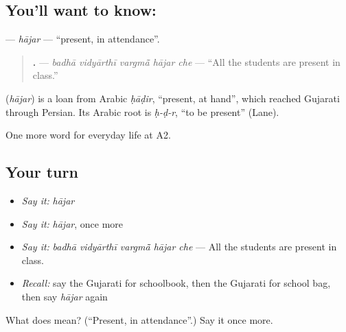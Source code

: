 \subsection*{You'll want to know: }
\textbf{} — \emph{hājar} — \textquotedblleft{}present, in attendance\textquotedblright{}.

\begin{quote}
\textbf{    .} — \emph{badhā vidyārthī vargmā̃ hājar che} — \textquotedblleft{}All the students are present in class.\textquotedblright{}
\end{quote}

\begin{cousinweb}
\textbf{} (\emph{hājar}) is a loan from Arabic \emph{ḥāḍir}, \textquotedblleft{}present, at hand\textquotedblright{}, which reached Gujarati through Persian. Its Arabic root is \emph{ḥ-ḍ-r}, \textquotedblleft{}to be present\textquotedblright{} (Lane).
\end{cousinweb}

\begin{grammarlens}[title={What you've built}]
One more word for everyday life at A2.
\end{grammarlens}

\subsection*{Your turn}
\begin{itemize}
\raggedright
  \item \emph{Say it:} \emph{hājar}
  \item \emph{Say it:} \emph{hājar}, once more
  \item \emph{Say it:} \emph{badhā vidyārthī vargmā̃ hājar che} — All the students are present in class.
  \item \emph{Recall:} say the Gujarati for schoolbook, then the Gujarati for school bag, then say \emph{hājar} again
\end{itemize}

\begin{tcolorbox}[breakable,colback=teal!4,colframe=teal!35!black,title={Before you move on}]
What does  mean? (\textquotedblleft{}Present, in attendance\textquotedblright{}.) Say it once more.
\end{tcolorbox}
